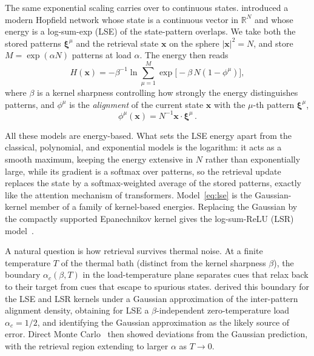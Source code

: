 \documentclass[letterpaper]{article} %
\newcommand{\bxi}{\boldsymbol{\xi}}
\newcommand{\bx}{\bm{x}}
\newcommand{\Bnet}{\beta}
\begin{document}
The same exponential scaling carries over to continuous states.
\citet{ramsauer2021hopfield} introduced a modern Hopfield network whose state is
a continuous vector in $\mathbb{R}^N$ and whose energy is a log-sum-exp (LSE) of the state-pattern
overlaps. We take both the stored patterns $\bxi^\mu$ and the retrieval state
$\bx$ on the sphere $|\bx|^2 = N$, and store $M = \exp(\alpha N)$ patterns at load $\alpha$. 
The energy then reads
\begin{equation}
H(\bx) = -\Bnet^{-1}\ln\sum_{\mu=1}^{M}\exp\!\big[-\Bnet\,N (1-\phi^\mu) \big],
\label{eq:lse}
\end{equation}
where $\Bnet$ is a kernel sharpness controlling how strongly the energy
distinguishes patterns, and $\phi^\mu$ is the \textit{alignment} of the current state $\bx$ 
with the $\mu$-th pattern $\bxi^\mu$,
\begin{equation}
    \phi^\mu(\bm{x}) = N^{-1} \bm{x} \cdot \bm{\xi}^\mu\,.
    \label{eq:alignment}
\end{equation}

All these models are energy-based. What sets the LSE energy apart from 
the classical, polynomial, and exponential models is the logarithm: 
it acts as a smooth maximum, keeping the energy extensive in $N$
rather than exponentially large, while its gradient is a softmax over patterns,
so the retrieval update replaces the state by a softmax-weighted average of the
stored patterns, exactly like the attention mechanism of transformers.
Model~\eqref{eq:lse} is the Gaussian-kernel member of a family of kernel-based
energies. Replacing the Gaussian by the compactly
supported Epanechnikov kernel gives the log-sum-ReLU (LSR)
model~\citep{hoover2025dense}.

A natural question is how retrieval survives thermal noise. At a finite
temperature $T$ of the thermal bath (distinct from the kernel sharpness $\Bnet$), the boundary
$\alpha_c(\Bnet, T)$ in the load-temperature plane separates cues that relax back
to their target from cues that escape to spurious states.
\citet{icml2026theory} derived this boundary for the LSE and LSR kernels under a
Gaussian approximation of the inter-pattern alignment density, obtaining for LSE
a $\Bnet$-independent zero-temperature load $\alpha_c = 1/2$, and identifying the 
Gaussian approximation as the likely source of error. Direct Monte
Carlo~\citep{iclr2026mc} then showed deviations from the Gaussian
prediction, with the retrieval region extending to larger $\alpha$ as $T\to0$.
\end{document}
